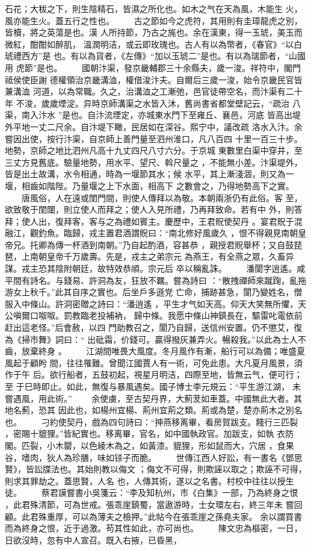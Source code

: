 \documentclass{ctexart}
\begin{document}
石花；大秡之下，則生陰精石，皆濕之所化也。如木之气在天為風，木能生 火，風亦能生火。蓋五行之性也。 　　古之節如今之虎符，其用則有圭璋龍虎之別，皆櫝，將之英蕩是也。漢 人所持節，乃古之旄也。余在漢東，得一玉琥，美玉而微紅，酣酣如醉肌， 溫潤明洁，或云即玫瑰也。古人有以為幣者，《春官》``以白琥禮西方''是 也。有以為貨者，《左傳》``加以玉琥二''是也。有以為瑞節者，``山國用 虎節''是也。 　　國朝汴渠，發京畿輔郡三十余縣夫，歲一浚。祥符中，閣門祗侯使臣謝 德權領治京畿溝洫，權借浚汴夫。自爾后三歲一浚，始令京畿民官皆兼溝洫 河道，以為常職。久之，治溝洫之工漸弛，邑官徒帶空名，而汴渠有二十年 不浚，歲歲堙淀。异時京師溝渠之水皆入沐，舊尚書省都堂壁記云，``疏治 八渠，南入汴水 ''是也。自汴流堙定，亦城東水門下至雍丘、襄邑，河底 皆高出堤外平地一丈二尺余。自汴堤下瞰，民居如在深谷。熙宁中，議改疏 洛水入汴。余嘗因出使，按行汴渠，自京師上善門量至泗州淮口，凡八百四 十里一百三十步。地勢，京師之地比泗州凡高十九丈四尺八寸六分。于京城 東數里白渠中穿井，至三丈方見舊底。驗量地勢，用水平、望尺、斡尺量之 ，不能無小差。汴渠堤外，皆是出土故溝，水令相通，時為一堰節其水；候 水平，其上漸淺涸，則又為一堰，相齒如階陛。乃量堰之上下水面，相高下 之數會之，乃得地勢高下之實。 　　唐風俗，人在遠或閨門間，則使人傳拜以為敬。本朝兩浙仍有此俗。客 至，欲致敬于閨闥，則立使人而拜之；使人入見所禮，乃再拜致命。若有中 外，則答拜；使人出，復拜客，客与之為禮如賓主。慶歷中，王君貺使契丹 。宴君貺于混融江，觀釣魚。臨歸，戎主置君酒謂貺曰：``南北修好風歲久 ，恨不得親見南朝皇帝兄。托卿為傳一杯酒到南朝。''乃自起酌酒，容甚恭 ，親授君貺舉杯；又自鼓琵琶，上南朝皇帝千万歲壽。先是，戎主之弟宗元 為燕王，有全燕之眾，久畜异謀。戎主恐其陰附朝廷，故特效恭順。宗元后 卒以稱亂誅。 　　潘閬字逍遙。咸平間有詩名。与錢易、許洞為友，狂放不羈。嘗為詩曰 ：``散拽禪師來蹴踘，亂拖游女上秋千。''此其自序之實也。后坐戶多遜党 亡命，捕跡甚急，閬乃變姓名，僧服入中條山。許洞密贈之詩曰：``潘逍遙 ，平生才气如天高。仰天大笑無所懼，天公嗔爾口呶呶。罰教臨老投補衲， 歸中條。我愿中條山神鎮長在，驅雷叱電依前赶出這老怪。''后會赦，以四 門助教召之，閬乃自歸，送信州安置。仍不懲艾，復為《掃市舞》詞曰：`` 出砒霜，价錢可。贏得撥灰兼弄火。暢殺我。''以此為士人不齒，放棄終身 。 　　江湖間唯畏大風度。冬月風作有漸，船行可以為備；唯盛夏風起于顧盻 間，往往罹難。曾聞江國賈人有一術，可免此患。大凡夏月風景，須作于午 后。欲行船者，五鼓初起，視星月明洁，四際至地，皆無云气，便可行；至 于巳時即止。如此，無復与暴風遇矣。國子博士李元規云：``平生游江湖， 未嘗遇風，用此術。'' 　　余使虜，至古契丹界，大薊茇如車蓋。中國無此大者。其地名薊，恐其 因此也，如楊州宜楊、荊州宜荊之類。荊或為楚，楚亦荊木之別名也。 　　刁約使契丹，戲為四句詩曰：``抻燕移离畢，看房賀跋支。餞行三匹裂 ，密賜十貔狸。''皆紀實也。移离畢，官名，如中國執政官。加跋支，如執 衣防閣。匹裂，小木罌，以色綾木為之，如黃漆。貔狸，形如鼠而大，穴居 ，食果谷，嗜肉，狄人為珍膳，味如铩子而脆。 　　世傳江西人好訟，有一書名《鄧思賢》，皆訟牒法也。其始則教以侮文 ；侮文不可得，則欺誣以取之；欺誣不可得，則求其罪劫之。蓋思賢，人名 也，人傳其術，遂以之名書。村校中往往以授生徒。 　　蔡君謨嘗書小吳箋云：``李及知杭州，市《白集》一部，乃為終身之恨 ，此君殊清節，可為世戒。張乖崖鎮蜀，當遨游時，士女環左右，終三年未 嘗回顧。此君殊重厚，可以為薄夫之檢押。''此帖今在張乖崖之孫堯夫家。 余以謂買書而為終身之恨，近于過激。苟其性如此，亦可尚也。 　　陳文忠為樞密，一日，日欲沒時，忽有中人宣召。既入右掖，已昏黑， 
\end{document}
